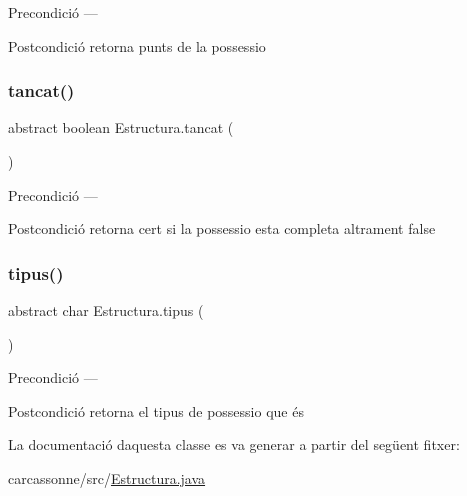 \begin{DoxyPrecond}{Precondició}
--- 
\end{DoxyPrecond}
\begin{DoxyPostcond}{Postcondició}
retorna punts de la possessio 
\end{DoxyPostcond}
\mbox{\label{class_estructura_a14634d639179cbff04fefe8f4ff9d46a}} 
\subsubsection{\texorpdfstring{tancat()}{tancat()}}
{\footnotesize\ttfamily abstract boolean Estructura.\+tancat (\begin{DoxyParamCaption}{ }\end{DoxyParamCaption})\hspace{0.3cm}{\ttfamily [abstract]}}

\begin{DoxyPrecond}{Precondició}
--- 
\end{DoxyPrecond}
\begin{DoxyPostcond}{Postcondició}
retorna cert si la possessio esta completa altrament false 
\end{DoxyPostcond}
\mbox{\label{class_estructura_a12bf84c0b65ccd29a08bbd8e82252698}} 
\subsubsection{\texorpdfstring{tipus()}{tipus()}}
{\footnotesize\ttfamily abstract char Estructura.\+tipus (\begin{DoxyParamCaption}{ }\end{DoxyParamCaption})\hspace{0.3cm}{\ttfamily [abstract]}}

\begin{DoxyPrecond}{Precondició}
--- 
\end{DoxyPrecond}
\begin{DoxyPostcond}{Postcondició}
retorna el tipus de possessio que és 
\end{DoxyPostcond}


La documentació d\textquotesingle{}aquesta classe es va generar a partir del següent fitxer\+:\begin{DoxyCompactItemize}
\item 
carcassonne/src/\mbox{\hyperlink{_estructura_8java}{Estructura.\+java}}\end{DoxyCompactItemize}
